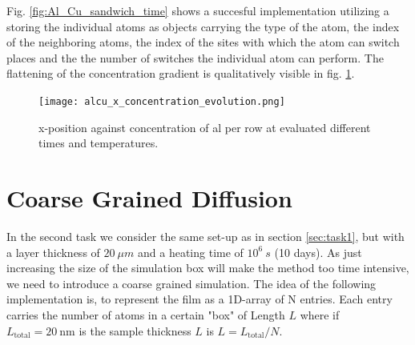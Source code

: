 Fig. \ref{fig:Al_Cu_sandwich_time} shows a succesful implementation utilizing a  storing the individual atoms as objects carrying the type of the atom, the index of the neighboring atoms, the index of the sites with which the atom can switch places and the the number of switches the individual atom can perform. The flattening of the concentration gradient is qualitatively visible in fig. \ref{fig:alcu_time_concentration_plot}.

\begin{figure}[htb]
	\centering
	\texttt{[image: alcu\_x\_concentration\_evolution.png]}
	\caption{x-position against concentration of al per row at evaluated different times and temperatures. }
	\label{fig:alcu_time_concentration_plot}
\end{figure}

\section{Coarse Grained Diffusion}
In the second task we consider the same set-up as in section \ref{sec:task1}, but with a layer thickness of \(20~\mu m \) and a heating time of \(10^{6}~s\) (10 days). As just increasing the size of the simulation box will make the method too time intensive, we need to introduce a coarse grained simulation. The idea of the following implementation is, to represent the film as a 1D-array of N entries. Each entry carries the number of atoms in a certain "box" of Length \(L\) where if \(L_{\mathrm{total}} = 20~\mathrm{nm}\) is the sample thickness \( L \) is \( L = L_{\mathrm{total}}/N \).

\printbibliography


